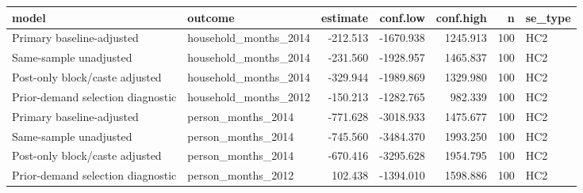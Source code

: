 
\begin{tabular}{llrrrrl}
\toprule
model & outcome & estimate & conf.low & conf.high & n & se\_type\\
\midrule
Primary baseline-adjusted & household\_months\_2014 & -212.513 & -1670.938 & 1245.913 & 100 & HC2\\
Same-sample unadjusted & household\_months\_2014 & -231.560 & -1928.957 & 1465.837 & 100 & HC2\\
Post-only block/caste adjusted & household\_months\_2014 & -329.944 & -1989.869 & 1329.980 & 100 & HC2\\
Prior-demand selection diagnostic & household\_months\_2012 & -150.213 & -1282.765 & 982.339 & 100 & HC2\\
Primary baseline-adjusted & person\_months\_2014 & -771.628 & -3018.933 & 1475.677 & 100 & HC2\\
\addlinespace
Same-sample unadjusted & person\_months\_2014 & -745.560 & -3484.370 & 1993.250 & 100 & HC2\\
Post-only block/caste adjusted & person\_months\_2014 & -670.416 & -3295.628 & 1954.795 & 100 & HC2\\
Prior-demand selection diagnostic & person\_months\_2012 & 102.438 & -1394.010 & 1598.886 & 100 & HC2\\
\bottomrule
\end{tabular}
